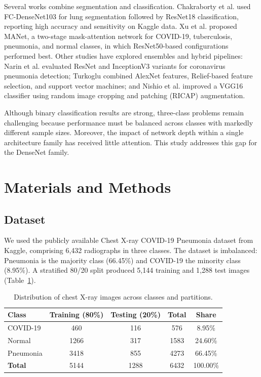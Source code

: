 \documentclass[pdflatex,sn-mathphys-num]{sn-jnl}%
\theoremstyle{thmstyleone}%
\theoremstyle{thmstyletwo}%
\theoremstyle{thmstylethree}%
\begin{document}
Several works combine segmentation and classification. Chakraborty et al. \cite{Chakraborty2021} used FC-DenseNet103 for lung segmentation followed by ResNet18 classification, reporting high accuracy and sensitivity on Kaggle data. Xu et al. \cite{Xu2021} proposed MANet, a two-stage mask-attention network for COVID-19, tuberculosis, pneumonia, and normal classes, in which ResNet50-based configurations performed best. Other studies have explored ensembles and hybrid pipelines: Narin et al. \cite{Narin2021} evaluated ResNet and InceptionV3 variants for coronavirus pneumonia detection; Turkoglu \cite{Turkoglu2021} combined AlexNet features, Relief-based feature selection, and support vector machines; and Nishio et al. \cite{Nishio2020} improved a VGG16 classifier using random image cropping and patching (RICAP) augmentation.

Although binary classification results are strong, three-class problems remain challenging because performance must be balanced across classes with markedly different sample sizes. Moreover, the impact of network depth within a single architecture family has received little attention. This study addresses this gap for the DenseNet family.

\section{Materials and Methods}
\label{sec:matmeth}

\subsection{Dataset}
\label{subsec:dataset}

We used the publicly available Chest X-ray COVID-19 Pneumonia dataset from Kaggle, comprising 6,432 radiographs in three classes. The dataset is imbalanced: Pneumonia is the majority class (66.45\%) and COVID-19 the minority class (8.95\%). A stratified 80/20 split produced 5,144 training and 1,288 test images (Table~\ref{tab:dataset_dist}).

\begin{table}[htbp]
\centering
\caption{Distribution of chest X-ray images across classes and partitions.}
\label{tab:dataset_dist}
\begin{tabular}{l c c c c}
\toprule
\textbf{Class} & \textbf{Training (80\%)} & \textbf{Testing (20\%)} & \textbf{Total} & \textbf{Share} \\
\midrule
COVID-19 & 460 & 116 & 576 & 8.95\% \\
Normal & 1266 & 317 & 1583 & 24.60\% \\
Pneumonia & 3418 & 855 & 4273 & 66.45\% \\
\midrule
\textbf{Total} & 5144 & 1288 & 6432 & 100.00\% \\
\bottomrule
\end{tabular}
\end{table}
\end{document}
